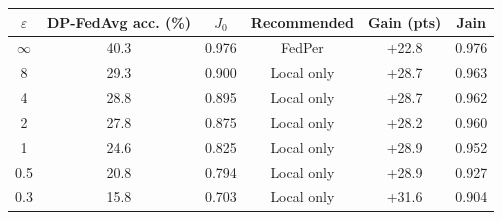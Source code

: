 \begin{tabular}{cccccc}
\toprule
$\varepsilon$ & DP-FedAvg acc. (\%) & $J_0$ & Recommended & Gain (pts) & Jain \\
\midrule
$\infty$ & 40.3 & 0.976 & FedPer & +22.8 & 0.976 \\
8 & 29.3 & 0.900 & Local only & +28.7 & 0.963 \\
4 & 28.8 & 0.895 & Local only & +28.7 & 0.962 \\
2 & 27.8 & 0.875 & Local only & +28.2 & 0.960 \\
1 & 24.6 & 0.825 & Local only & +28.9 & 0.952 \\
0.5 & 20.8 & 0.794 & Local only & +28.9 & 0.927 \\
0.3 & 15.8 & 0.703 & Local only & +31.6 & 0.904 \\
\bottomrule
\end{tabular}
